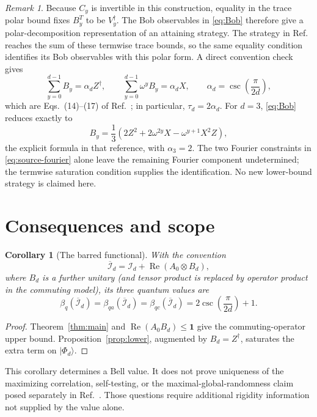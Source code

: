 \documentclass[11pt]{article}
\newtheorem{corollary}[theorem]{Corollary}
\theoremstyle{remark}
\newtheorem{remark}[theorem]{Remark}
\newcommand{\Id}{\mathbf 1}
\newcommand{\cI}{\mathcal I}
\newcommand{\Reop}{\operatorname{Re}}
\begin{document}
\begin{remark}
Because \(C_y\) is invertible in this construction, equality in the trace
polar bound fixes \(B_y^T\) to be \(V_y^\dagger\).  The Bob observables in
\eqref{eq:Bob} therefore give a polar-decomposition representation of an
attaining strategy.  The strategy in Ref.~\cite{PeritoEtAl2026} reaches the
sum of these termwise trace bounds, so the same equality condition identifies
its Bob observables with this polar form.  A direct convention check gives
\begin{equation}
  \sum_{y=0}^{d-1}B_y=\alpha_dZ^\dagger,
  \qquad
  \sum_{y=0}^{d-1}\omega^yB_y=\alpha_dX,
  \qquad
  \alpha_d=\csc\!\left(\frac{\pi}{2d}\right),
  \label{eq:source-fourier}
\end{equation}
which are Eqs.~(14)--(17) of Ref.~\cite{PeritoEtAl2026}; in particular,
\(\tau_d=2\alpha_d\).  For \(d=3\), \eqref{eq:Bob} reduces exactly to
\[
  B_y=\frac13\left(
       2Z^2+2\omega^{2y}X-\omega^{y+1}X^2Z
       \right),
\]
the explicit formula in that reference, with \(\alpha_3=2\).  The two
Fourier constraints in \eqref{eq:source-fourier} alone leave the remaining
Fourier component undetermined; the termwise saturation condition supplies
the identification.  No new lower-bound strategy is claimed here.
\end{remark}

\section{Consequences and scope}

\begin{corollary}[The barred functional]
\label{cor:barred}
With the convention
\[
  \overline{\cI}_d
  =
  \cI_d+\Reop(A_0\otimes B_d),
\]
where \(B_d\) is a further unitary (and tensor product is replaced by
operator product in the commuting model), its three quantum values are
\[
  \beta_q(\overline{\cI}_d)
  =
  \beta_{qa}(\overline{\cI}_d)
  =
  \beta_{qc}(\overline{\cI}_d)
  =
  2\csc\!\left(\frac{\pi}{2d}\right)+1.
\]
\end{corollary}

\begin{proof}
Theorem~\ref{thm:main} and
\(
\Reop(A_0B_d)\leq\Id
\)
give the commuting-operator upper bound.  Proposition~\ref{prop:lower},
augmented by
\(
B_d=Z^\dagger
\),
saturates the extra term on \(\lvert\Phi_d\rangle\).
\end{proof}

This corollary determines a Bell value.  It does not prove uniqueness of the
maximizing correlation, self-testing, or the maximal-global-randomness claim
posed separately in Ref.~\cite{PeritoEtAl2026}.  Those questions require
additional rigidity information not supplied by the value alone.
\end{document}
